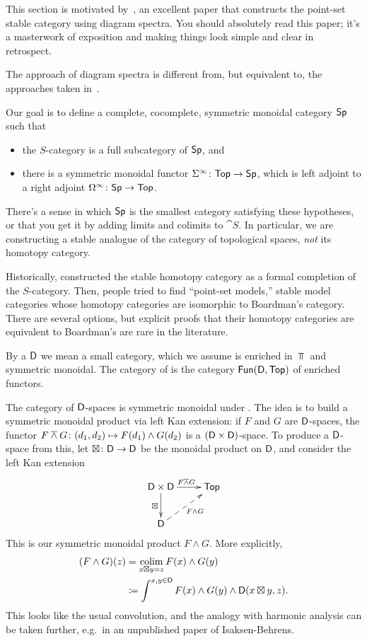 This section is motivated by~\cite{MMSS}, an excellent paper that constructs the point-set stable category using
diagram spectra. You should absolutely read this paper; it's a masterwork of exposition and making things look
simple and clear in retrospect.

The approach of diagram spectra is different from, but equivalent to, the approaches taken
in~\cite{LMS,AlaskaNotes}.

Our goal is to define a complete, cocomplete, symmetric monoidal category $\mathsf{Sp}$ such that
\begin{itemize}
	\item the $S$-category is a full subcategory of $\mathsf{Sp}$, and
	\item there is a symmetric monoidal functor $\Sigma^\infty\colon\mathsf{Top}\to\mathsf{Sp}$, which is left adjoint to a right
	adjoint $\Omega^\infty\colon\mathsf{Sp}\to\mathsf{Top}$.
\end{itemize}
There's a sense in which $\mathsf{Sp}$ is the smallest category satisfying these hypotheses, or that you get it by adding
limits and colimits to $\cat S$. In particular, we are constructing a stable analogue of the category of
topological spaces, \emph{not} its homotopy category.
\begin{rem}
Historically,  constructed the stable homotopy category as a formal completion of the
$S$-category. Then, people tried to find ``point-set models,'' stable model categories whose homotopy categories
are isomorphic to Boardman's category. There are several options, but explicit proofs that their homotopy
categories are equivalent to Boardman's are rare in the literature.
\end{rem}
\begin{defn}
By a  $\mathsf D$ we mean a small category, which we assume is enriched in $\Top$ and symmetric monoidal.
The category of  is the category $\mathsf{Fun}(\mathsf D,\mathsf{Top})$ of enriched functors.
\end{defn}
The category of $\mathsf D$-spaces is symmetric monoidal under . The idea is to build a symmetric
monoidal product via left Kan extension: if $F$ and $G$ are $\mathsf D$-spaces, the functor $F\overwedge
G\colon(d_1,d_2)\mapsto F(d_1)\wedge G(d_2)$ is a $(\mathsf D\times\mathsf D)$-space. To produce a $\mathsf D$-space from this, let
$\boxtimes\colon\mathsf D\to\mathsf D$ be the monoidal product on $\mathsf D$, and consider the left Kan extension
\begin{equation}
\label{Day_convolution}
\gathxy{
	\fD\times\fD\ar[r]^{F\overwedge G}\ar[d]_\boxtimes & \Top\\
	\fD\ar@{-->}[ur]_{F\wedge G}
}
\end{equation}
This is our symmetric monoidal product $F\wedge G$. More explicitly,
\begin{align*}
( F\wedge G)(z) &= \operatorname*{colim}_{x\boxtimes y = z} F(x)\wedge G(y)\\
								&\coloneqq \int^{x, y\in \mathsf D} F(x) \wedge G(y) \wedge \mathsf D(x\boxtimes y, z).
\end{align*}
This looks like the usual convolution, and the analogy with harmonic analysis can be taken further, e.g.\ in an
unpublished paper of Isaksen-Behrens.

